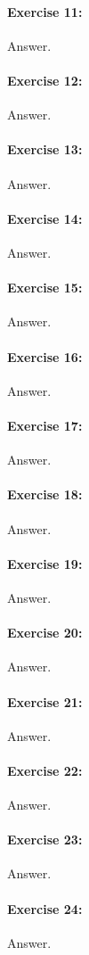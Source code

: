\documentclass{article}
\begin{document}
\paragraph{Exercise 11:}
Answer.
\paragraph{Exercise 12:}
Answer.
\paragraph{Exercise 13:}
Answer.
\paragraph{Exercise 14:}
Answer.
\paragraph{Exercise 15:}
Answer.
\paragraph{Exercise 16:}
Answer.
\paragraph{Exercise 17:}
Answer.
\paragraph{Exercise 18:}
Answer.
\paragraph{Exercise 19:}
Answer.
\paragraph{Exercise 20:}
Answer.
\paragraph{Exercise 21:}
Answer.
\paragraph{Exercise 22:}
Answer.
\paragraph{Exercise 23:}
Answer.
\paragraph{Exercise 24:}
Answer.
\end{document}
